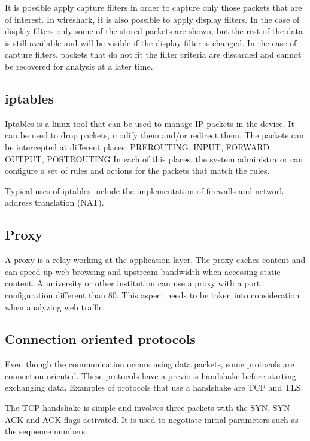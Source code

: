 It is possible apply capture filters in order to capture only those packets that are of interest.
In wireshark, it is also possible to apply display filters.
In the case of display filters only some of the stored packets are shown, but the rest of the data is still available and will be visible if the display filter is changed.
In the case of capture filters, packets that do not fit the filter criteria are discarded and cannot be recovered for analysis at a later time.

\subsection{iptables}

Iptables is a linux tool that can be used to manage IP packets in the device.
It can be used to drop packets, modify them and/or redirect them.
The packets can be intercepted at different places: PREROUTING, INPUT, FORWARD, OUTPUT, POSTROUTING
In each of this places, the system administrator can configure a set of rules and actions for the packets that match the rules.

Typical uses of iptables include the implementation of firewalls and network address translation (NAT).

\subsection{Proxy}

A proxy is a relay working at the application layer.
The proxy caches content and can speed up web browsing and upstream bandwidth when accessing static content.
A university or other institution can use a proxy with a port configuration different than 80.
This aspect needs to be taken into consideration when analyzing web traffic.

\subsection{Connection oriented protocols}

Even though the communication occurs using data packets, some protocols are connection oriented.
These protocols have a previous handshake before starting exchanging data.
Examples of protocols that use a handshake are TCP and TLS.

The TCP handshake is simple and involves three packets with the SYN, SYN-ACK and ACK flags activated.
It is used to negotiate initial parameters such as the sequence numbers.

